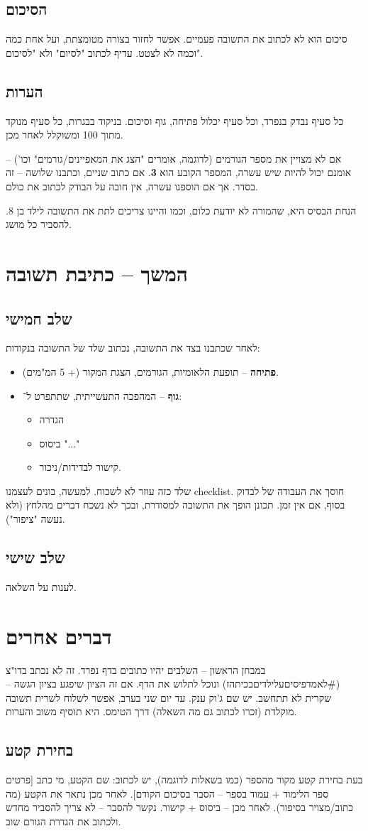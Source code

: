 \documentclass[]{article}
\begin{document}
	\subsection{הסיכום}
	סיכום הוא לא לכתוב את התשובה פעמיים. אפשר לחזור בצורה מטומצתת, ועל אחת כמה וכמה לא לצטט. עדיף לכתוב "לסיום" ולא "לסיכום". 
	\subsection{הערות}
	כל סעיף נבדק בנפרד, וכל סעיף יכלול פתיחה, גוף וסיכום. בניקוד בבגרות, כל סעיף מנוקד מתוך 100 ומשוקלל לאחר מכן. 
	
	אם לא מצויין את מספר הגורמים (לדוגמה, אומרים "הצג את המאפיינים/גורמים" וכו') – אומנם יכול להיות שיש עשרה, המספר הקובע הוא \textbf{3}. אם כתוב שניים, וכתבנו שלושה – זה בסדר. אך אם הוספנו עשרה, אין חובה על הבודק לכתוב את כולם. 
	
	 הנחת הבסיס היא, שהמורה לא יודעת כלום, וכמו והיינו צריכים לתת את התשובה לילד בן 8. להסביר כל מושג. 
	
	\section{המשך – כתיבת תשובה}
	\subsection{שלב חמישי}
	לאחר שכתבנו בצד את התשובה, נכתוב שלד של התשובה בנקודות: 
	\begin{itemize}
		\item \textbf{פתיחה} – תופעת הלאומיות, הגורמים, הצגת המקור (+ 5 המ"מים). 
		\item \textbf{גוף} – המהפכה התעשייתית, שתתפרט ל־: 
		\begin{itemize}
			\item הגדרה
			\item ביסוס "..."
			\item קישור לבדידות/ניכור. 
		\end{itemize}
	\end{itemize}
	
	שלד כזה עוזר לא לשכוח. למעשה, בונים לעצמנו checklist. חוסך את העבודה של לבדוק בסוף, אם אין זמן. תכונן הופך את התשובה למסודרת, ובכך לא נשכח דברים מהלחץ (ולא נעשה "ציפור"). 
	\subsection{שלב שישי}
	לענות על השלאה. 
	
	\section{דברים אחרים}
	במבחן הראשון – השלבים יהיו כתובים בדף נפרד. זה לא נכתב בדו"צ (\#לאמדפיסיםעלילדיםבכיתהז) ונוכל לתלוש את הדף. 
	אם זה הציון שיפגע בציון הגשה – שקרית לא תתחשב. יש שם ג'וק ענק. 
	עד יום שני בערב, אפשר לשלוח לשרית תשובה מוקלדת (זכרו לכתוב גם מה השאלה) דרך הטימס. היא תוסיף משוב והערות. 
	
	\subsection{בחירת קטע}
	בעת בחירת קטע מקור מהספר (כמו בשאלות לדוגמה), יש לכתוב: 
	שם הקטע, מי כתב [פרטים ספר הלימוד + עמוד בספר – הסבר בסיכום הקודם]. לאחר מכן נתאר את הקטע (מה כתוב/מצויר בסיפור). לאחר מכן – ביסוס + קישור. נקשר להסבר – לא צריך להסביר מחדש ולכתוב את הגדרת הגורם שוב. 
\end{document}
